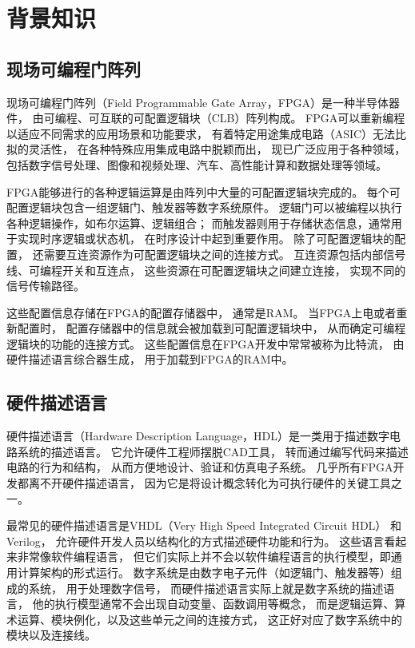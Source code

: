 \section{背景知识}

\subsection{现场可编程门阵列}

现场可编程门阵列（Field Programmable Gate Array，FPGA）是一种半导体器件，
由可编程、可互联的可配置逻辑块（CLB）阵列构成。
FPGA可以重新编程以适应不同需求的应用场景和功能要求，
有着特定用途集成电路（ASIC）无法比拟的灵活性，
在各种特殊应用集成电路中脱颖而出，
现已广泛应用于各种领域，
包括数字信号处理、图像和视频处理、汽车、高性能计算和数据处理等领域。

FPGA能够进行的各种逻辑运算是由阵列中大量的可配置逻辑块完成的。
每个可配置逻辑块包含一组逻辑门、触发器等数字系统原件。
逻辑门可以被编程以执行各种逻辑操作，如布尔运算、逻辑组合；
而触发器则用于存储状态信息，通常用于实现时序逻辑或状态机，
在时序设计中起到重要作用。
除了可配置逻辑块的配置，
还需要互连资源作为可配置逻辑块之间的连接方式。
互连资源包括内部信号线、可编程开关和互连点，
这些资源在可配置逻辑块之间建立连接，
实现不同的信号传输路径。

这些配置信息存储在FPGA的配置存储器中，
通常是RAM。
当FPGA上电或者重新配置时，
配置存储器中的信息就会被加载到可配置逻辑块中，
从而确定可编程逻辑块的功能的连接方式。
这些配置信息在FPGA开发中常常被称为比特流，
由硬件描述语言综合器生成，
用于加载到FPGA的RAM中。

\subsection{硬件描述语言}

硬件描述语言（Hardware Description Language，HDL）是一类用于描述数字电路系统的描述语言。
它允许硬件工程师摆脱CAD工具，
转而通过编写代码来描述电路的行为和结构，
从而方便地设计、验证和仿真电子系统。
几乎所有FPGA开发都离不开硬件描述语言，
因为它是将设计概念转化为可执行硬件的关键工具之一。

最常见的硬件描述语言是VHDL（Very High Speed Integrated Circuit HDL）
和Verilog，
允许硬件开发人员以结构化的方式描述硬件功能和行为。
这些语言看起来非常像软件编程语言，
但它们实际上并不会以软件编程语言的执行模型，即通用计算架构的形式运行。
数字系统是由数字电子元件（如逻辑门、触发器等）组成的系统，
用于处理数字信号，
而硬件描述语言实际上就是数字系统的描述语言，
他的执行模型通常不会出现自动变量、函数调用等概念，
而是逻辑运算、算术运算、模块例化，以及这些单元之间的连接方式，
这正好对应了数字系统中的模块以及连接线。

